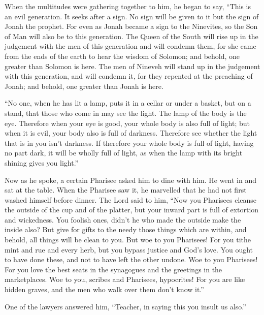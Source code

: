  When the multitudes were gathering together to him, he
began to say, ``This is an evil generation. It seeks after a sign. No
sign will be given to it but the sign of Jonah the prophet.
 For even as Jonah became a sign to the Ninevites, so the
Son of Man will also be to this generation.  The Queen of
the South will rise up in the judgement with the men of this generation
and will condemn them, for she came from the ends of the earth to hear
the wisdom of Solomon; and behold, one greater than Solomon is here.
 The men of Nineveh will stand up in the judgement with
this generation, and will condemn it, for they repented at the preaching
of Jonah; and behold, one greater than Jonah is here.

 ``No one, when he has lit a lamp, puts it in a cellar or
under a basket, but on a stand, that those who come in may see the
light.  The lamp of the body is the eye. Therefore when
your eye is good, your whole body is also full of light; but when it is
evil, your body also is full of darkness.  Therefore see
whether the light that is in you isn't darkness.  If
therefore your whole body is full of light, having no part dark, it will
be wholly full of light, as when the lamp with its bright shining gives
you light.''

 Now as he spoke, a certain Pharisee asked him to dine
with him. He went in and sat at the table.  When the
Pharisee saw it, he marvelled that he had not first washed himself
before dinner.  The Lord said to him, ``Now you Pharisees
cleanse the outside of the cup and of the platter, but your inward part
is full of extortion and wickedness.  You foolish ones,
didn't he who made the outside make the inside also?  But
give for gifts to the needy those things which are within, and behold,
all things will be clean to you.  But woe to you
Pharisees! For you tithe mint and rue and every herb, but you bypass
justice and God's love. You ought to have done these, and not to have
left the other undone.  Woe to you Pharisees! For you
love the best seats in the synagogues and the greetings in the
marketplaces.  Woe to you, scribes and Pharisees,
hypocrites! For you are like hidden graves, and the men who walk over
them don't know it.''

 One of the lawyers answered him, ``Teacher, in saying
this you insult us also.''

